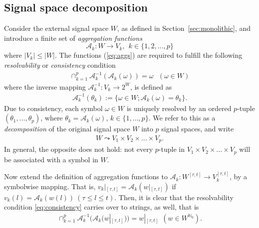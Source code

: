 \documentclass[a4paper, 10pt, conference]{ieeeconf}
\newcommand{\nato}{{\mathbb{N}_0}}
\newcommand{\taut}{{_{[\tau,t]}}}
\newcommand{\ak}{\mathcal{A}_k}
\newcommand{\tautn}{{{[\tau,t]}}}
\begin{document}
\subsection{Signal space decomposition}
\label{sec:abstraction}
Consider the external signal space $W$, as defined in Section~\ref{sec:monolithic}, and introduce a finite set of \emph{aggregation functions}\begin{equation}
\label{eq:aggs}
\mathcal{A}_k: W\to V_k,~~k\in\{1,2,\ldots,p\}
\end{equation}
where $|V_k|\leq |W|$. The functions (\ref{eq:aggs}) are required to fulfill the following \emph{resolvability} or \emph{consistency} condition
\begin{align}
\label{eq:consistency}
\cap_{k=1}^{p} \mathcal{A}_k^{-1}(\mathcal{A}_k(\omega))=\omega~~~(\omega\in W)
\end{align}
where the inverse mapping $\mathcal{A}^{-1}_k:V_k\to 2^W$, is defined as
\begin{align}
\mathcal{A}_k^{-1}({\theta_k}):=\{\omega\in W; \mathcal{A}_k(\omega)={\theta_k} \}.
\end{align}
Due to consistency, each symbol $\omega \in W$ is uniquely resolved by an ordered $p$-tuple $({\theta_1},\ldots, {\theta_p})$, where ${\theta_k}=\mathcal{A}_k(\omega)$, $k\in\{1,\ldots,p\}$. We refer to this as a \emph{decomposition} of the original signal space $W$ into $p$ signal spaces, and write
\begin{align}\label{eq:decomposition}
W \leadsto V_1\times V_2\times \ldots \times V_p.
\end{align}
In general, the opposite does not hold: not every $p$-tuple in $V_1\times V_2\times \ldots \times V_p$ will be associated with a symbol in $W$.


Now extend the definition of aggregation functions to $\ak: W^\tautn \to V_k^\tautn$, by a symbolwise mapping. That is,  $v_k|\taut=\ak(w|\taut)$ if $v_k(l)=\ak(w(l))~(\tau\leq l \leq t)$. Then, it is clear that the resolvability condition \eqref{eq:consistency} carries over to strings, as well, that is
\begin{align}
\label{eq:consistency_seq}
\cap_{k=1}^{p} \mathcal{A}_k^{-1}(\ak(w|\taut))=w|\taut ~~(w\in W^\nato).
\end{align}
\end{document}
